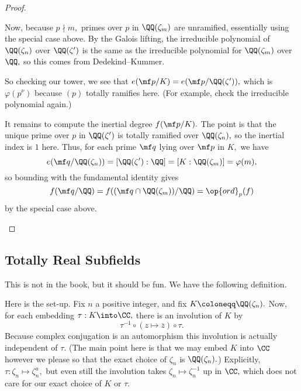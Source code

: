 \documentclass[../notes.tex]{subfiles}
\begin{document}
\begin{proof}
\begin{itemize}
		Now, because $p\nmid m,$ primes over $p$ in $\QQ(\zeta_m)$ are unramified, essentially using the special case above. By the Galois lifting, the irreducible polynomial of $\QQ(\zeta_n)$ over $\QQ(\zeta')$ is the same as the irreducible polynomial for $\QQ(\zeta_m)$ over $\QQ,$ so this comes from Dedekind--Kummer.

		So checking our tower, we see that $e(\mf p/K)=e(\mf p/\QQ(\zeta')),$ which is $\varphi\left(p^\nu\right)$ because $(p)$ totally ramifies here. (For example, check the irreducible polynomial again.)

		It remains to compute the inertial degree $f(\mf p/K).$ The point is that the unique prime over $p$ in $\QQ(\zeta')$ is totally ramified over $\QQ(\zeta_n),$ so the inertial index is $1$ here. Thus, for each prime $\mf q$ lying over $\mf p$ in $K,$ we have
		\[e(\mf q/\QQ(\zeta_n))=[\QQ(\zeta'):\QQ]=[K:\QQ(\zeta_m)]=\varphi(m),\]
		so bounding with the fundamental identity\todo{} gives
		\[f(\mf q/\QQ)=f((\mf q\cap\QQ(\zeta_m))/\QQ)=\op{ord}_p(f)\]
		by the special case above. 
		\qedhere
	\end{itemize}
\end{proof}

\subsection{Totally Real Subfields}
This is not in the book, but it should be fun. We have the following definition.

Here is the set-up. Fix $n$ a positive integer, and fix $K\coloneqq \QQ(\zeta_n).$ Now, for each embedding $\tau:K\into\CC,$ there is an involution of $K$ by
\[\tau^{-1}\circ(z\mapsto\overline z)\circ\tau.\]
Because complex conjugation is an automorphism this involution is actually independent of $\tau.$ (The main point here is that we may embed $K$ into $\CC$ however we please so that the exact choice of $\zeta_n$ is $\QQ(\zeta_n).$) Explicitly, $\tau:\zeta_n\mapsto\zeta_n^a,$ but even still the involution takes $\zeta_n\mapsto\zeta_n^{-1}$ up in $\CC,$ which does not care for our exact choice of $K$ or $\tau.$
\end{document}

